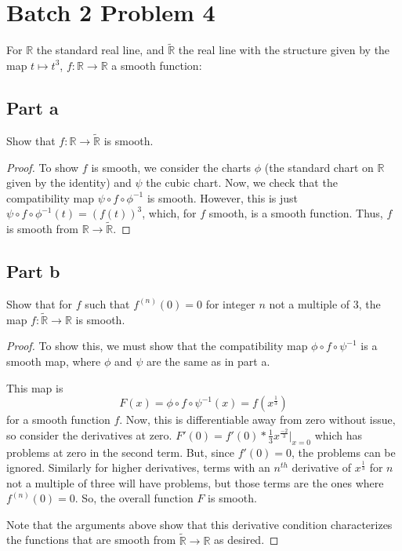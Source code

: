 \documentclass[fontsize=11pt]{scrartcl} %
\numberwithin{equation}{section} %
\numberwithin{figure}{section} %
\numberwithin{table}{section} %
\begin{document}
\section*{Batch 2 Problem 4}
For $\mathbb{R}$ the standard real line, and $\widetilde{\mathbb{R}}$ the real line
with the structure given by the map $t\mapsto t^3$, $f:\mathbb{R}\to\mathbb{R}$ a smooth
function:
\subsection*{Part a}
Show that $f:\mathbb{R}\to\widetilde{\mathbb{R}}$ is smooth.
\\
\begin{proof}
To show $f$ is smooth, we consider the charts $\phi$ (the standard chart on $\mathbb{R}$ given
by the identity) and $\psi$ the cubic chart.
Now, we check that the compatibility map $\psi\circ f\circ\phi^{-1}$ is smooth.
However, this is just $\psi\circ f\circ\phi^{-1}(t) = (f(t))^3$, which, for $f$ smooth, is a
smooth function. Thus, $f$ is smooth from $\mathbb{R}\to\widetilde{\mathbb{R}}$.
\end{proof}

\subsection*{Part b}
Show that for $f$ such that $f^{(n)}(0) = 0$ for integer $n$ not a multiple of $3$,
the map $f:\widetilde{\mathbb{R}}\to\mathbb{R}$ is smooth.
\\
\begin{proof}
To show this, we must show that the compatibility map $\phi\circ f\circ\psi^{-1}$ is
a smooth map, where $\phi$ and $\psi$ are the same as in part a.

This map is
\[
F(x) = \phi\circ f\circ\psi^{-1}(x) = f(x^{\frac{1}{3}})
\]
for a smooth function $f$. Now, this is differentiable away from zero without issue,
so consider the derivatives at zero.
$F'(0) = f'(0)*\frac{1}{3}x^{\frac{-2}{3}}|_{x=0}$ which has problems at zero in the
second term. But, since $f'(0)=0$, the problems can be ignored. Similarly for higher
derivatives, terms with an $n^{th}$ derivative of $x^{\frac{1}{3}}$ for $n$ not a multiple
of three will have problems, but those terms are the ones where $f^{(n)}(0) = 0$.
So, the overall function $F$ is smooth.

Note that the arguments above show that this derivative condition characterizes the
functions that are smooth from $\widetilde{\mathbb{R}}\to\mathbb{R}$ as desired.
\end{proof}
\end{document}
